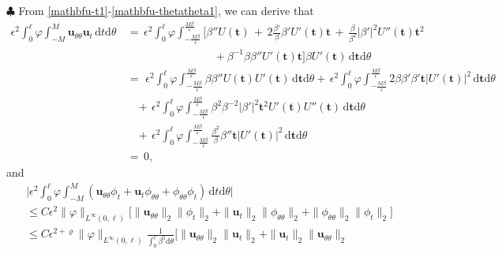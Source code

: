 \documentclass[10pt, reqno]{amsart}
\numberwithin{equation}{section}
\theoremstyle{definition}
\begin{document}
{{\smallskip
\noindent$\clubsuit$
From \eqref{mathbfu-t1}-\eqref{mathbfu-thetatheta1}, we can derive that
\begin{align*}
 \epsilon^2\int_0^\ell \varphi \int_{-M}^{M}
 {\mathbf u}_{\theta\theta}{\mathbf u}_t
 \,{\mathrm d}t{\mathrm d}\theta
 &\,=\,\epsilon^2\int_0^\ell \varphi \displaystyle\int_{-\frac{M\beta}{\epsilon}}^{\frac{M\beta}{\epsilon}}
 \Bigg[\beta''U({\mathbf t})
 \,+\, 2\frac{\beta'}{\beta}\beta' U'({\mathbf t}){\mathbf t}
 \,+\, \frac{\beta}{\beta^2} |\beta' |^2 U''({\mathbf t}){\mathbf t}^2
\nonumber\\[2mm]
 &\qquad\qquad\qquad\qquad+ \beta^{-1}\beta\beta'' U'({\mathbf t}){\mathbf t}
 \Bigg]\beta U'({\mathbf t})\,{\mathrm d}{\mathbf t}{\mathrm d}\theta
\nonumber\\[2mm]
 &\,=\,\,\epsilon^2\int_0^\ell \varphi \displaystyle\int_{-\frac{M\beta}{\epsilon}}^{\frac{M\beta}{\epsilon}}
 \beta\beta''U({\mathbf t})U'({\mathbf t})
 \,{\mathrm d}{\mathbf t}{\mathrm d}\theta+\,\epsilon^2\int_0^\ell \varphi \displaystyle\int_{-\frac{M\beta}{\epsilon}}^{\frac{M\beta}{\epsilon}}
 2\beta\beta'\beta' {\mathbf t}|U'({\mathbf t})|^2
 \,{\mathrm d}{\mathbf t}{\mathrm d}\theta
\nonumber\\[2mm]
 &\quad+\,\epsilon^2\int_0^\ell \varphi \displaystyle\int_{-\frac{M\beta}{\epsilon}}^{\frac{M\beta}{\epsilon}} \beta^2\beta^{-2}|\beta'|^2{\mathbf t}^2U'({\mathbf t})U''({\mathbf t})
 \,{\mathrm d}{\mathbf t}{\mathrm d}\theta
\nonumber\\[2mm]
 &\quad+\,\epsilon^2\int_0^\ell \varphi \displaystyle\int_{-\frac{M\beta}{\epsilon}}^{\frac{M\beta}{\epsilon}}
 \frac{\beta^2}{\beta}\beta'' {\mathbf t} |U'({\mathbf t})|^2
 \,{\mathrm d}{\mathbf t}{\mathrm d}\theta
\nonumber\\[2mm]
 &
 \,=\,0,
\end{align*}
 and
\begin{align*}
 &\Bigg|\epsilon^2\int_0^\ell \varphi \int_{-M}^{M}
 ({\mathbf u}_{\theta\theta}\phi_t+{\mathbf u}_t\phi_{\theta\theta}+\phi_{\theta\theta}\phi_t)
 \,{\mathrm d}t{\mathrm d}\theta
 \Bigg|
\nonumber\\[2mm]
 &\leq
 C\epsilon^2\|\varphi\|_{L^\infty(0,\ell)}
 \Big[\|{\mathbf u}_{\theta\theta}\|_2\|\phi_t\|_2+\|{\mathbf u}_t\|_2\|\phi_{\theta\theta}\|_2
 +\|\phi_{\theta\theta}\|_2\|\phi_t\|_2\Big]
\nonumber\\[2mm]
 &\leq
 C\epsilon^{2+\varrho}\|\varphi\|_{L^\infty(0,\ell)}
 \frac{1}{\displaystyle\int_0^{\ell}\beta^5 {\mathrm d}\theta}
 \Big[\|{\mathbf u}_{\theta\theta}\|_2\|{\mathbf u}_t\|_2+\|{\mathbf u}_t\|_2\|{\mathbf u}_{\theta\theta}\|_2

\end{align*}}}
\end{document}
